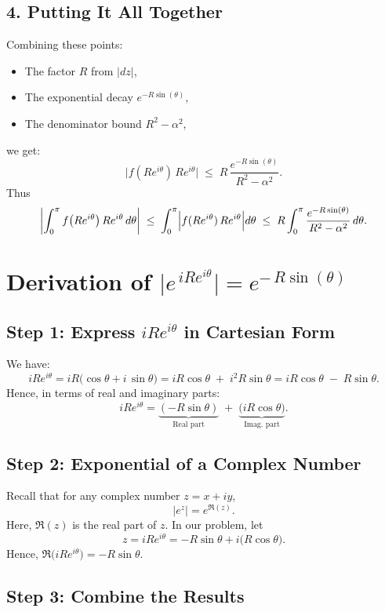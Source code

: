 \documentclass[12pt]{article}
\theoremstyle{definition} %
\theoremstyle{plain} %
\begin{document}
\subsection*{4. Putting It All Together}
Combining these points:

\begin{itemize}
\item The factor $R$ from $|dz|$,
\item The exponential decay $e^{-R\sin(\theta)}$,
\item The denominator bound $R^2 - \alpha^2$,
\end{itemize}
we get:
\[
\bigl\lvert f(Re^{i\theta})\,Re^{i\theta}\bigr\rvert 
\;\le\; 
R\,\frac{e^{-R\sin(\theta)}}{\,R^2-\alpha^2\,}.
\]
Thus
\[
\left\lvert \int_{0}^{\pi} f\bigl(Re^{i\theta}\bigr)\,Re^{i\theta}\,d\theta\right\rvert
\;\le\;
\int_{0}^{\pi} \Bigl\lvert f(Re^{i\theta})\,Re^{i\theta}\Bigr\rvert d\theta
\;\le\;
R \int_{0}^{\pi} \frac{e^{-R\sin(\theta)}}{\,R^2 - \alpha^2\,}\,d\theta.
\]

\section*{Derivation of \(\lvert e^{\,i R e^{i\theta}} \rvert = e^{-\,R\sin(\theta)}\)}

\subsection*{Step 1: Express \(i R e^{i\theta}\) in Cartesian Form}

We have:
\[
i R e^{i\theta} 
= i R \bigl(\cos\theta + i\,\sin\theta\bigr)
= i R \cos\theta \;+\; i^2 R \sin\theta 
= i R \cos\theta \;-\; R \sin\theta.
\]
Hence, in terms of real and imaginary parts:
\[
i R e^{i\theta} 
= \underbrace{(- R \sin\theta)}_{\text{Real part}}
\;+\;
\underbrace{\bigl(i R \cos\theta\bigr)}_{\text{Imag.\ part}}.
\]

\subsection*{Step 2: Exponential of a Complex Number}

Recall that for any complex number \(z = x + i y\),
\[
\bigl\lvert e^z \bigr\rvert 
= e^{\Re(z)}.
\]
Here, \(\Re(z)\) is the real part of \(z\). In our problem, let
\[
z = i R e^{i\theta} = - R \sin\theta + i\bigl(R\cos\theta\bigr).
\]
Hence, \(\Re\bigl(i R e^{i\theta}\bigr) = -R \sin\theta\).

\subsection*{Step 3: Combine the Results}
\end{document}
